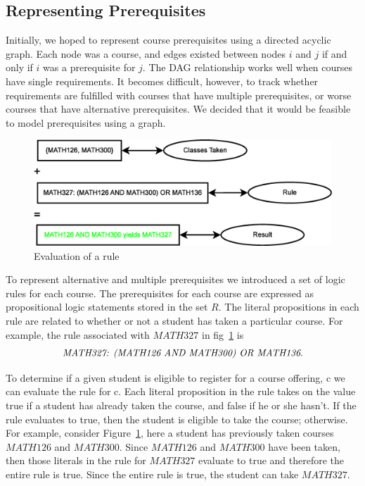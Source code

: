 \documentclass[11pt]{article} %
\begin{document}
\subsection{Representing Prerequisites} Initially, we hoped to represent course
prerequisites using a directed acyclic graph. Each node was a course, and edges
existed between nodes $i$ and $j$ if and only if $i$ was a prerequisite for $j$.
The DAG relationship works well when courses have single requirements. It
becomes difficult, however, to track whether requirements are fulfilled with courses
that have multiple prerequisites, or worse courses that have alternative
prerequisites. We decided that it would be feasible to model prerequisites
using a graph.
\begin{figure} [ht] 
    \begin{center}
        \includegraphics[scale=0.4]{prereq_logic_example} 
    \end{center}
    \caption{Evaluation of a rule} 
    \label{logic_ex} 
\end{figure}

To represent alternative and multiple prerequisites we introduced a set of logic
rules for each course. The prerequisites for each course are expressed as
propositional logic statements stored in the set $R$. The literal propositions
in each rule are related to whether or not a student has taken a particular
course. For example, the rule associated with $MATH327$ in fig~\ref{logic_ex} is
$$ \text{{\it MATH327: (MATH126 AND MATH300) OR MATH136}}.$$

To determine if a given student is eligible to register for a course offering,
c we can evaluate the rule for c. Each literal proposition in the rule takes on
the value true if a student has already taken the course, and false if he or she
hasn't.  If the rule evaluates to true, then the student is eligible to take the
course; otherwise. For example, consider Figure~\ref{logic_ex}, here a student
has previously taken courses $MATH126$ and $MATH300$. Since $MATH126$ and
$MATH300$ have been taken, then those literals in the rule for $MATH327$
evaluate to true and therefore the entire rule is true.  Since the entire rule
is true, the student can take $MATH327$.
\end{document}
